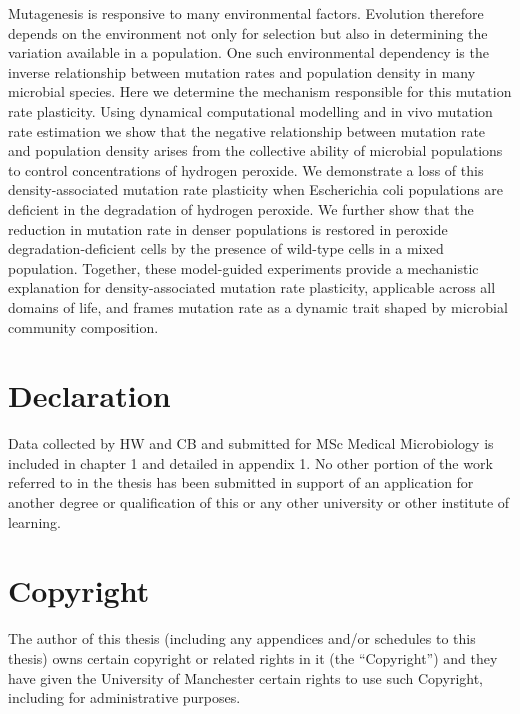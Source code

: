 \documentclass[
  12pt,
  letterpaper,
  DIV=11,
  numbers=noendperiod]{scrreprt}
\begin{document}
Mutagenesis is responsive to many environmental factors. Evolution
therefore depends on the environment not only for selection but also in
determining the variation available in a population. One such
environmental dependency is the inverse relationship between mutation
rates and population density in many microbial species. Here we
determine the mechanism responsible for this mutation rate plasticity.
Using dynamical computational modelling and in vivo mutation rate
estimation we show that the negative relationship between mutation rate
and population density arises from the collective ability of microbial
populations to control concentrations of hydrogen peroxide. We
demonstrate a loss of this density-associated mutation rate plasticity
when Escherichia coli populations are deficient in the degradation of
hydrogen peroxide. We further show that the reduction in mutation rate
in denser populations is restored in peroxide degradation-deficient
cells by the presence of wild-type cells in a mixed population.
Together, these model-guided experiments provide a mechanistic
explanation for density-associated mutation rate plasticity, applicable
across all domains of life, and frames mutation rate as a dynamic trait
shaped by microbial community composition.


\hypertarget{declaration}{%
\chapter*{Declaration}\label{declaration}}


Data collected by HW and CB and submitted for MSc Medical Microbiology
is included in chapter 1 and detailed in appendix 1. No other portion of
the work referred to in the thesis has been submitted in support of an
application for another degree or qualification of this or any other
university or other institute of learning.


\hypertarget{copyright}{%
\chapter*{Copyright}\label{copyright}}


The author of this thesis (including any appendices and/or schedules to
this thesis) owns certain copyright or related rights in it (the
``Copyright'') and they have given the University of Manchester certain
rights to use such Copyright, including for administrative purposes.
\end{document}
